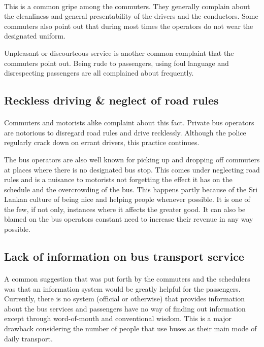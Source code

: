 \paragraph{} This is a common gripe among the commuters. They generally complain about the cleanliness and general presentability of the drivers and the conductors. Some commuters also point out that during most times the operators do not wear the designated uniform.

Unpleasant or discourteous service is another common complaint that the commuters point out. Being rude to passengers, using foul language and disrespecting passengers are all complained about frequently.

\subsection{Reckless driving \& neglect of road rules}

\paragraph{} Commuters and motorists alike complaint about this fact. Private bus operators are notorious to disregard  road rules and drive recklessly. Although the police regularly crack down on errant drivers, this practice continues. 

The bus operators are also well known for picking up and dropping off commuters at places where there is no designated bus stop. This comes under neglecting road rules and is a nuisance to motorists not forgetting the effect it has on the schedule and the overcrowding of the bus. This happens partly because of the Sri Lankan culture of being nice and helping people whenever possible. It is one of the few, if not only, instances where it affects the greater good. It can also be blamed on the bus operators constant need to increase their revenue in any way possible. 

\subsection{Lack of information on bus transport service}

\paragraph{} A common suggestion that was put forth by the commuters and the schedulers was that an information system would be greatly helpful for the passengers. Currently, there is no system (official or otherwise) that provides information about the bus services and passengers have no way of finding out information except through word-of-mouth and conventional wisdom. This is a major drawback considering the number of people that use buses as their main mode of daily transport.



